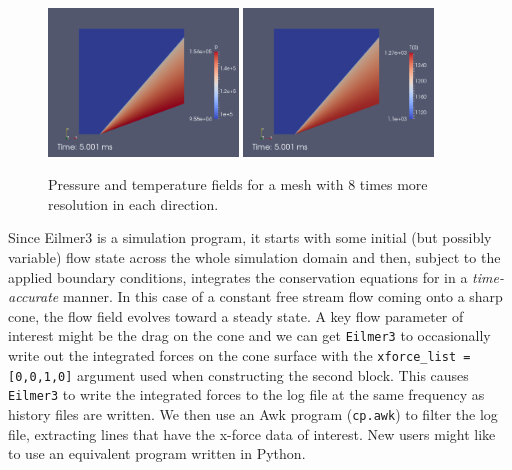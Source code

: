 \begin{figure}[htbp]
\begin{center}
\includegraphics[width=0.45\textwidth]{../2D/cone20-simple/cone20_p_factor-8-grid-res.png}
\includegraphics[width=0.45\textwidth]{../2D/cone20-simple/cone20_T0_factor-8-grid-res.png}
\end{center}
\caption{Pressure and temperature fields for a mesh with 8 times more resolution in each direction.}
\label{cone20-high-res-fig}
\end{figure}

\medskip
Since Eilmer3 is a simulation program, it starts with some initial (but possibly variable) 
flow state across the whole simulation domain and then, subject to the applied boundary conditions,
integrates the conservation equations for in a \textit{time-accurate} manner.
In this case of a constant free stream flow coming onto a sharp cone, the flow field evolves toward 
a steady state.
A key flow parameter of interest might be the drag on the cone and we can get \verb!Eilmer3! to
occasionally write out the integrated forces on the cone surface with the \verb!xforce_list = [0,0,1,0]!
argument used when constructing the second block.
This causes \verb!Eilmer3! to write the integrated forces to the log file 
at the same frequency as history files are written.
We then use an Awk program (\verb!cp.awk!) to filter the log file, 
extracting lines that have the x-force data of interest.
New users might like to use an equivalent program written in Python.

\noindent \topbar
{}
\bottombar
      
